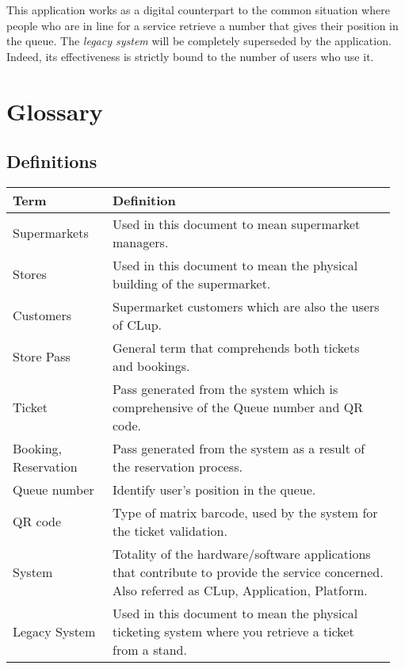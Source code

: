 This application works as a digital counterpart to the common situation where people who are in line for a service retrieve a number that gives their position in the queue. The \textit{legacy system} will be completely superseded by the application. Indeed, its effectiveness is strictly bound to the number of users who use it.

\section{Glossary}
\subsection{Definitions}
\begin{center}
	\begin{tabular}{@{}p{0.25\linewidth} p{0.71\linewidth}@{}}
		\toprule
		\textbf{Term} & \textbf{Definition}\\
		\midrule
		Supermarkets & Used in this document to mean supermarket managers.\\
		Stores & Used in this document to mean the physical building of the supermarket.\\
		Customers & Supermarket customers which are also the users of CLup.\\
		Store Pass & General term that comprehends both tickets and bookings.\\
		Ticket & Pass generated from the system which is comprehensive of the Queue number and QR code.\\
		Booking, Reservation & Pass generated from the system as a result of the reservation process.\\
		Queue number & Identify user's position in the queue.\\
		QR code & Type of matrix barcode, used by the system for the ticket validation.\\
		System & Totality of the hardware/software applications that contribute to provide the service concerned. Also referred as CLup, Application, Platform.\\
		Legacy System & Used in this document to mean the physical ticketing system where you retrieve a ticket from a stand.\\
		\bottomrule
	\end{tabular}
\end{center}

